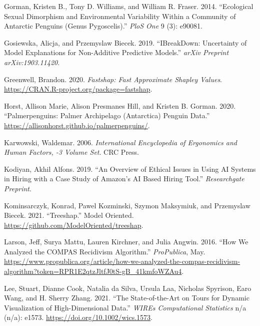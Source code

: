\documentclass[
]{article}
\newlength{\cslhangindent}
\newlength{\cslentryspacingunit} %
\newenvironment{CSLReferences}[2] %
 {%
  \setlength{\parindent}{0pt}
  \ifodd #1
  \let\oldpar\par
  \def\par{\hangindent=\cslhangindent\oldpar}
  \fi
  \setlength{\parskip}{#2\cslentryspacingunit}
 }%
 {}
\begin{document}
\begin{CSLReferences}{1}{0}
\leavevmode{}%
Gorman, Kristen B., Tony D. Williams, and William R. Fraser. 2014. {``Ecological Sexual Dimorphism and Environmental Variability Within a Community of {Antarctic} Penguins (Genus {Pygoscelis}).''} \emph{PloS One} 9 (3): e90081.

\leavevmode{}%
Gosiewska, Alicja, and Przemyslaw Biecek. 2019. {``{IBreakDown}: {Uncertainty} of Model Explanations for Non-Additive Predictive Models.''} \emph{arXiv Preprint arXiv:1903.11420}.

\leavevmode{}%
Greenwell, Brandon. 2020. \emph{Fastshap: {Fast} {Approximate} {Shapley} {Values}}. \url{https://CRAN.R-project.org/package=fastshap}.

\leavevmode{}%
Horst, Allison Marie, Alison Presmanes Hill, and Kristen B. Gorman. 2020. {``Palmerpenguins: {Palmer} {Archipelago} ({Antarctica}) Penguin Data.''} \url{https://allisonhorst.github.io/palmerpenguins/}.

\leavevmode{}%
Karwowski, Waldemar. 2006. \emph{International {Encyclopedia} of {Ergonomics} and {Human} {Factors}, -3 {Volume} {Set}}. CRC Press.

\leavevmode{}%
Kodiyan, Akhil Alfons. 2019. {``An Overview of Ethical Issues in Using {AI} Systems in Hiring with a Case Study of {Amazon}'s {AI} Based Hiring Tool.''} \emph{Researchgate Preprint}.

\leavevmode{}%
Kominsarczyk, Konrad, Pawel Kozminski, Szymon Maksymiuk, and Przemyslaw Biecek. 2021. {``Treeshap.''} Model Oriented. \url{https://github.com/ModelOriented/treeshap}.

\leavevmode{}%
Larson, Jeff, Surya Mattu, Lauren Kirchner, and Julia Angwin. 2016. {``How {We} {Analyzed} the {COMPAS} {Recidivism} {Algorithm}.''} \emph{ProPublica}, May. \url{https://www.propublica.org/article/how-we-analyzed-the-compas-recidivism-algorithm?token=RPR1E2qtzJltfJ0tS-gB_41kmfoWZAu4}.

\leavevmode{}%
Lee, Stuart, Dianne Cook, Natalia da Silva, Ursula Laa, Nicholas Spyrison, Earo Wang, and H. Sherry Zhang. 2021. {``The State-of-the-Art on Tours for Dynamic Visualization of High-Dimensional Data.''} \emph{WIREs Computational Statistics} n/a (n/a): e1573. \url{https://doi.org/10.1002/wics.1573}.


\end{CSLReferences}
\end{document}
